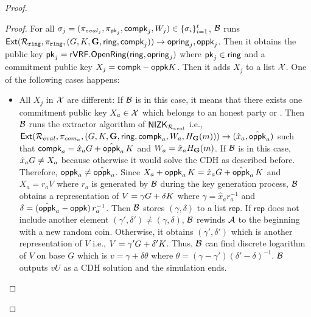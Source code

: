 \begin{proof}
\begin{proof}
			For all $ \sigma_j = (\pi_{eval_j},\pi_{\mathsf{pk}_j},\mathsf{compk}_j,W_j) \in \{\sigma_i\}_{i =1}^t $, $ \mathcal{B} $ runs $ \mathsf{Ext}(\mathcal{R}_{\mathtt{ring}},\pi_{\mathtt{ring}},(G,K,{\mathbf{G}},\mathsf{ring}, \mathsf{compk}_j) ) \rightarrow \mathsf{opring}_j, \mathsf{oppk}_j$. Then it obtains the public key $ \mathsf{pk}_j = {\mathsf{rVRF}}.{\mathsf{OpenRing}}(\mathsf{ring}, \mathsf{opring}_j) $ where $ \mathsf{pk}_j \in \mathsf{ring} $ and a commitment public key $ X_j = \mathsf{compk}- \mathsf{oppk} K $. Then it adds $ X_j $ to a list $ {\mathcal{X}}  $. One of the following cases happens:
			
			\begin{itemize}
				\item All $ X_j $ in $ {\mathcal{X}} $ are different: If $ \mathcal{B} $ is in this case, it means that there exists one commitment public key $ X_a \in {\ensuremath{\mathcal{X}}} $ which belongs to an honest party or . Then $ \mathcal{B} $ runs the extractor algorithm of $ {\mathsf{NIZK}}_{\mathcal{R}_{eval}} $ i.e., $ \mathsf{Ext}(\mathcal{R}_{eval},\pi_{com_a},(G,K,{\mathbf{G}},\mathsf{ring}, \mathsf{compk}_a,W_a,H_{\mathbf{G}}(m))) \rightarrow (\hat{x}_a,\hat{\mathsf{oppk}}_a )$ such that $ \mathsf{compk}_a = \hat{x}_aG + \hat{\mathsf{oppk}}_a \,K $ and $ W_a = \hat{x}_a H_{\mathbf{G}}(m) $.  If $ \mathcal{B} $ is in this case, $ \hat{x}_aG\neq X_a $ because otherwise it would solve the CDH as described before. Therefore, $ \mathsf{oppk}_a \neq \hat{\mathsf{oppk}}_a $. Since $ X_a + \mathsf{oppk}_a \, K = \hat{x}_aG + \hat{\mathsf{oppk}}_a \,K  $ and $ X_a = r_aV $ where $ r_a $ is generated by $ \mathcal{B} $ during the key generation process, $ \mathcal{B} $ obtains a representation of $ V = \gamma G + \delta K $ where $ \gamma = \hat{x}_ar^{-1}_a  $ and $ \delta = (\hat{\mathsf{oppk}}_a -\mathsf{oppk})\,r_a^{-1} $. Then $ \mathcal{B} $ stores $ (\gamma, \delta) $ to a list $ \mathsf{rep} $. If $ \mathsf{rep} $ does not include another element $ (\gamma', \delta')  \neq (\gamma, \delta) $, $ \mathcal{B} $ rewinds $ \mathcal{A} $ to the beginning with a new random coin.  Otherwise, it obtains $ (\gamma', \delta') $ which is another representation of $ V $ i.e., $ V = \gamma' G + \delta' K $. Thus, $ \mathcal{B} $ can find discrete logarithm of $ V $ on base $ G $ which is $ v = \gamma + \delta \theta $ where $ \theta = (\gamma - \gamma')(\delta' - \delta)^{-1} $. $ \mathcal{B} $ outputs $ vU $ as a CDH solution and the simulation ends.
				

\end{itemize}
\end{proof}
\end{proof}
